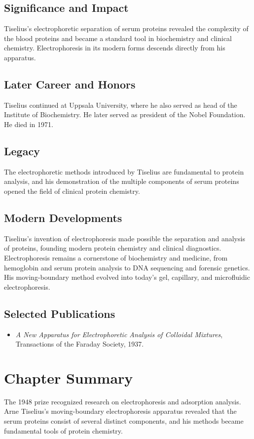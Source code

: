 \subsection*{Significance and Impact}

Tiselius's electrophoretic separation of serum proteins revealed the complexity of the blood proteins and became a standard tool in biochemistry and clinical chemistry. Electrophoresis in its modern forms descends directly from his apparatus.

\subsection*{Later Career and Honors}

Tiselius continued at Uppsala University, where he also served as head of the Institute of Biochemistry. He later served as president of the Nobel Foundation. He died in 1971.

\subsection*{Legacy}

The electrophoretic methods introduced by Tiselius are fundamental to protein analysis, and his demonstration of the multiple components of serum proteins opened the field of clinical protein chemistry.

\subsection*{Modern Developments}

Tiselius's invention of electrophoresis made possible the separation and analysis of proteins, founding modern protein chemistry and clinical diagnostics. Electrophoresis remains a cornerstone of biochemistry and medicine, from hemoglobin and serum protein analysis to DNA sequencing and forensic genetics. His moving-boundary method evolved into today's gel, capillary, and microfluidic electrophoresis.

\subsection*{Selected Publications}

\begin{itemize}

\item \emph{A New Apparatus for Electrophoretic Analysis of Colloidal Mixtures}, Transactions of the Faraday Society, 1937.

\end{itemize}

\clearpage

\section*{Chapter Summary}

The 1948 prize recognized research on electrophoresis and adsorption analysis. Arne Tiselius's moving-boundary electrophoresis apparatus revealed that the serum proteins consist of several distinct components, and his methods became fundamental tools of protein chemistry.
